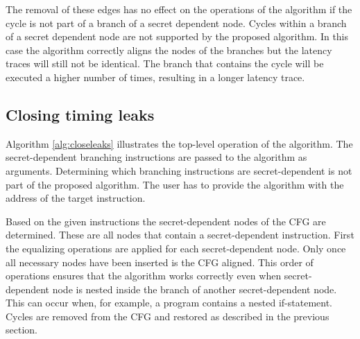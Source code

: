 The removal of these edges has no effect on the operations of the algorithm if the cycle is not part of a branch of a secret dependent node.  
Cycles within a branch of a secret dependent node are not supported by the proposed algorithm.
In this case the algorithm correctly aligns the nodes of the branches but the latency traces will still not be identical.
The branch that contains the cycle will be executed a higher number of times, resulting in a longer latency trace. 

\subsection{Closing timing leaks}
Algorithm \ref{alg:closeleaks} illustrates the top-level operation of the algorithm. 
The secret-dependent branching instructions are passed to the algorithm as arguments. 
Determining which branching instructions are secret-dependent is not part of the proposed algorithm. 
The user has to provide the algorithm with the address of the target instruction.

Based on the given instructions the secret-dependent nodes of the CFG are determined. 
These are all nodes that contain a secret-dependent instruction. 
First the equalizing operations are applied for each secret-dependent node. 
Only once all necessary nodes have been inserted is the CFG aligned.
This order of operations ensures that the algorithm works correctly even when secret-dependent node is nested inside the branch of another secret-dependent node. 
This can occur when, for example, a program contains a nested if-statement. Cycles are removed from the CFG and restored as described in the previous section.



